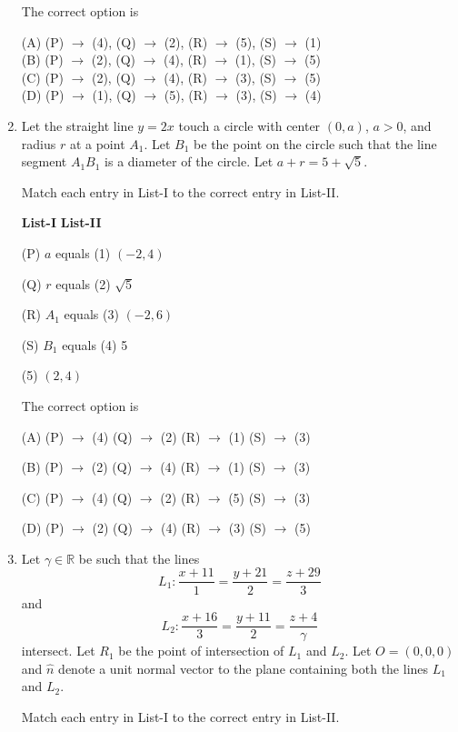\documentclass[12pt,a4paper]{article}
\begin{document}
\begin{enumerate}
The correct option is

(A) (P) $\rightarrow$ (4), (Q) $\rightarrow$ (2), (R) $\rightarrow$ (5), (S) $\rightarrow$ (1) \\
(B) (P) $\rightarrow$ (2), (Q) $\rightarrow$ (4), (R) $\rightarrow$ (1), (S) $\rightarrow$ (5) \\
(C) (P) $\rightarrow$ (2), (Q) $\rightarrow$ (4), (R) $\rightarrow$ (3), (S) $\rightarrow$ (5) \\
(D) (P) $\rightarrow$ (1), (Q) $\rightarrow$ (5), (R) $\rightarrow$ (3), (S) $\rightarrow$ (4)
    
\item Let the straight line $y = 2x$ touch a circle with center $(0, a)$, $a > 0$, and radius $r$ at a point $A_1$.
Let $B_1$ be the point on the circle such that the line segment $A_1B_1$ is a diameter of the circle. Let $a + r = 5 + \sqrt{5}$.

Match each entry in List-I to the correct entry in List-II.

\textbf{List-I} \hfill \textbf{List-II}

(P) $a$ equals \hfill (1) $(-2, 4)$

(Q) $r$ equals \hfill (2) $\sqrt{5}$

(R) $A_1$ equals \hfill (3) $(-2, 6)$

(S) $B_1$ equals \hfill (4) 5

\hfill (5) $(2, 4)$

The correct option is

(A) (P) $\rightarrow$ (4) \quad (Q) $\rightarrow$ (2) \quad (R) $\rightarrow$ (1) \quad (S) $\rightarrow$ (3)

(B) (P) $\rightarrow$ (2) \quad (Q) $\rightarrow$ (4) \quad (R) $\rightarrow$ (1) \quad (S) $\rightarrow$ (3)

(C) (P) $\rightarrow$ (4) \quad (Q) $\rightarrow$ (2) \quad (R) $\rightarrow$ (5) \quad (S) $\rightarrow$ (3)

(D) (P) $\rightarrow$ (2) \quad (Q) $\rightarrow$ (4) \quad (R) $\rightarrow$ (3) \quad (S) $\rightarrow$ (5)
\item Let $\gamma\in\mathbb{R}$ be such that the lines
\[L_{1}:\frac{x+11}{1}=\frac{y+21}{2}=\frac{z+29}{3}\]
and
\[L_{2}:\frac{x+16}{3}=\frac{y+11}{2}=\frac{z+4}{\gamma}\]
intersect. Let $R_{1}$ be the point of intersection of $L_{1}$ and $L_{2}$. Let $O=(0,0,0)$ and $\hat{n}$ denote a unit normal vector to the plane containing both the lines $L_{1}$ and $L_{2}$.

Match each entry in List-I to the correct entry in List-II.


\end{enumerate}
\end{document}
